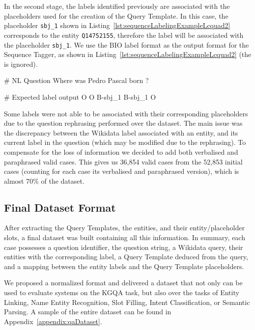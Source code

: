 In the second stage, the labels identified previously are associated with the placeholders used 
for the creation of the Query Template. In this case, the placeholder \texttt{sbj\_1} shown in 
Listing~\ref{lst:sequenceLabelingExampleLcquad2} corresponds to the entity \texttt{Q14752155}, 
therefore the label  will be associated with the placeholder \texttt{sbj\_1}. 
We use the BIO label format as the output format for the Sequence Tagger, as shown in 
Listing~\ref{lst:sequenceLabelingExampleLcquad2} (the  is ignored).

\begin{sparqlcode}[%
    caption={BIO label representation for a Natural Language Question.}, 
    label={lst:sequenceLabelingExampleLcquad2}]
# NL Question
Where was Pedro Pascal born ?

# Expected label output
O O B-sbj_1 B-sbj_1 O
\end{sparqlcode}

Some labels were not able to be associated with their corresponding placeholders due to the 
question rephrasing performed over the \LCQuADtwo{} dataset. The main issue was the discrepancy between the 
Wikidata label associated with an entity, and its current label in the question (which may be 
modified due to the rephrasing). To compensate for the loss of information we decided to add 
both verbalised and paraphrased valid cases. This gives us 36,854 valid cases from the 52,853 
initial cases (counting for each case its verbalised and paraphrased version), which is almost 
70\% of the dataset.

\subsection{Final Dataset Format}
\label{cap4:experimentalDesign/QaDataset/finalFormat}
After extracting the Query Templates, the entities, and their entity/placeholder slots, a final 
\LCQuADtwo{} dataset was built containing all this information. In summary, each case possesses a 
question identifier, the question string, a Wikidata \SPARQL{} query, their entities with the 
corresponding label, a Query Template deduced from the \SPARQL{} query, and a mapping between the 
entity labels and the Query Template placeholders. 

We proposed a normalized format and delivered a dataset that not only can be used to evaluate 
systems on the KGQA task, but also over the tasks of Entity Linking, Name Entity Recognition, 
Slot Filling, Intent Classification, or Semantic Parsing. A sample of the entire dataset can be 
found in Appendix~\ref{appendix:qaDataset}.

